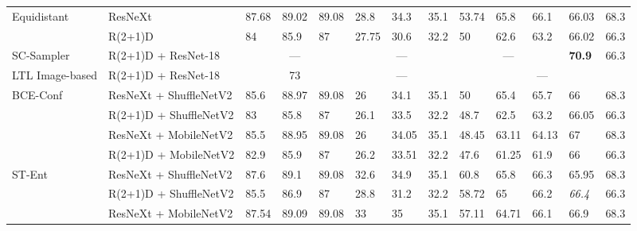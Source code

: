\documentclass[a4paper,conference]{IEEEtran}
\begin{document}
\begin{table*}[h]
\begin{center}
{\begin{tabular}{lllllllllllll}
Equidistant & \cellcolor[HTML]{EFEFEF}ResNeXt & 87.68 & 89.02 & 89.08 & \cellcolor[HTML]{EFEFEF}28.8 & \cellcolor[HTML]{EFEFEF}34.3 & \cellcolor[HTML]{EFEFEF}35.1 & 53.74 & 65.8 & 66.1 & 66.03 & 68.3 \\
 & \cellcolor[HTML]{EFEFEF}R(2+1)D & 84 & 85.9 & 87 & \cellcolor[HTML]{EFEFEF}27.75 & \cellcolor[HTML]{EFEFEF}30.6 & \cellcolor[HTML]{EFEFEF}32.2 & 50 & 62.6 & 63.2 & 66.02 & 66.3 \\ \hline
SC-Sampler \cite{korbar2019scsampler} & \cellcolor[HTML]{EFEFEF}R(2+1)D + ResNet-18 & \multicolumn{3}{c}{—} & \multicolumn{3}{c}{\cellcolor[HTML]{EFEFEF}—} & \multicolumn{3}{c}{—} & \textbf{70.9} & 66.3 \\ \hline
LTL Image-based \cite{gao2020listen} & \cellcolor[HTML]{EFEFEF}R(2+1)D + ResNet-18 & \multicolumn{3}{c}{73} & \multicolumn{3}{c}{\cellcolor[HTML]{EFEFEF}—} & \multicolumn{5}{c}{—} \\ \hline
BCE-Conf \cite{devries2018learning} & \cellcolor[HTML]{EFEFEF}ResNeXt + ShuffleNetV2 & 85.6 & 88.97 & 89.08 & \cellcolor[HTML]{EFEFEF}26 & \cellcolor[HTML]{EFEFEF}34.1 & \cellcolor[HTML]{EFEFEF}35.1 & 50 & 65.4 & 65.7 & 66 & 68.3 \\
 & \cellcolor[HTML]{EFEFEF}R(2+1)D + ShuffleNetV2 & 83 & 85.8 & 87 & \cellcolor[HTML]{EFEFEF}26.1 & \cellcolor[HTML]{EFEFEF}33.5 & \cellcolor[HTML]{EFEFEF}32.2 & 48.7 & 62.5 & 63.2 & 66.05 & 66.3 \\
 & \cellcolor[HTML]{EFEFEF}ResNeXt + MobileNetV2 & 85.5 & 88.95 & 89.08 & \cellcolor[HTML]{EFEFEF}26 & \cellcolor[HTML]{EFEFEF}34.05 & \cellcolor[HTML]{EFEFEF}35.1 & 48.45 & 63.11 & 64.13 & 67 & 68.3 \\
 & \cellcolor[HTML]{EFEFEF}R(2+1)D + MobileNetV2 & 82.9 & 85.9 & 87 & \cellcolor[HTML]{EFEFEF}26.2 & \cellcolor[HTML]{EFEFEF}33.51 & \cellcolor[HTML]{EFEFEF}32.2 & 47.6 & 61.25 & 61.9 & 66 & 66.3 \\ \hline
ST-Ent \cite{gal2016uncertainty} & \cellcolor[HTML]{EFEFEF}ResNeXt + ShuffleNetV2 & 87.6 & 89.1 & 89.08 & \cellcolor[HTML]{EFEFEF}32.6 & \cellcolor[HTML]{EFEFEF}34.9 & \cellcolor[HTML]{EFEFEF}35.1 & 60.8 & 65.8 & 66.3 & 65.95 & 68.3 \\
 & \cellcolor[HTML]{EFEFEF}R(2+1)D + ShuffleNetV2 & 85.5 & 86.9 & 87 & \cellcolor[HTML]{EFEFEF}28.8 & \cellcolor[HTML]{EFEFEF}31.2 & \cellcolor[HTML]{EFEFEF}32.2 & 58.72 & 65 & 66.2 & \textit{66.4} & 66.3 \\
 & \cellcolor[HTML]{EFEFEF}ResNeXt + MobileNetV2 & 87.54 & 89.09 & 89.08 & \cellcolor[HTML]{EFEFEF}33 & \cellcolor[HTML]{EFEFEF}35 & \cellcolor[HTML]{EFEFEF}35.1 & 57.11 & 64.71 & 66.1 & 66.9 & 68.3 \\

\end{tabular}}
\end{center}
\end{table*}
\end{document}
